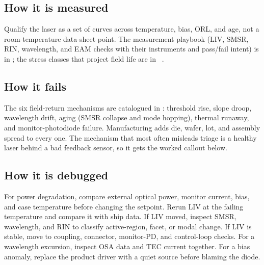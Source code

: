 \subsection{How it is measured}
\label{sec:lasers-how-measured}

Qualify the laser as a set of curves across temperature, bias, ORL, and age, not a
room-temperature data-sheet point. The measurement playbook (LIV, SMSR, RIN,
wavelength, and EAM checks with their instruments and pass/fail intent) is in
; the stress classes that project field life
are in ~\cite{gr468}.

\subsection{How it fails}
\label{sec:lasers-how-fails}

The six field-return mechanisms are catalogued in :
threshold rise, slope droop, wavelength drift, aging (SMSR collapse and mode
hopping), thermal runaway, and monitor-photodiode failure. Manufacturing adds die,
wafer, lot, and assembly spread to every one. The mechanism that most often
misleads triage is a healthy laser behind a bad feedback sensor, so it gets the
worked callout below.


\subsection{How it is debugged}
\label{sec:lasers-how-debugged}

For power degradation, compare external optical power, monitor current, bias, and
case temperature before changing the setpoint. Rerun LIV at the failing
temperature and compare it with ship data. If LIV moved, inspect SMSR, wavelength,
and RIN to classify active-region, facet, or modal change. If LIV is stable, move
to coupling, connector, monitor-PD, and control-loop checks. For a wavelength
excursion, inspect OSA data and TEC current together. For a bias anomaly, replace
the product driver with a quiet source before blaming the diode.

